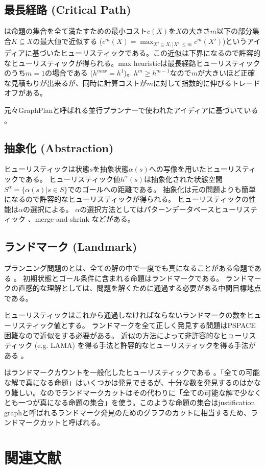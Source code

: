 \subsection{最長経路 (Critical Path)}

 \cite{haslum:00}は命題の集合を全て満たすための最小コスト$c(X)$を$X$の大きさ$m$以下の部分集合$K \subseteq X$の最大値で近似する ($c^m(X) = \max_{X' \subseteq X, |X'| \leq m} c^m(X')$)というアイディアに基づいたヒューリスティックである。この近似は下界になるので許容的なヒューリスティックが得られる。max heuristicは最長経路ヒューリスティックのうち$m=1$の場合である ($h^{max} = h^1$)。$h^m \geq h^{m-1}$なので$m$が大きいほど正確な見積もりが出来るが、同時に計算コストが$m$に対して指数的に伸びるトレードオフがある。

元々GraphPlanと呼ばれる並行プランナーで使われたアイディアに基づいている \cite{blum:97}。

\subsection{抽象化 (Abstraction)}

ヒューリスティックは状態$s$を抽象状態$\alpha(s)$への写像を用いたヒューリスティックである。
ヒューリスティック値$h^\alpha(s)$は抽象化された状態空間$S^\alpha = \{\alpha(s) | s \in S\}$でのゴールへの距離である。
抽象化は元の問題よりも簡単になるので許容的なヒューリスティックが得られる。
ヒューリスティックの性能は$\alpha$の選択による。
$\alpha$の選択方法としてはパターンデータベースヒューリスティック \cite{culberson1998pattern,edelkamp2001planning,holte:04,katz2008structural}、merge-and-shrink \cite{helmert2007flexible,helmert2014merge}などがある。


\subsection{ランドマーク (Landmark)}

プランニング問題のとは、全ての解の中で一度でも真になることがある命題である \cite{porteous2001extraction}。
初期状態とゴール条件に含まれる命題はランドマークである。
ランドマークの直感的な理解としては、問題を解くために通過する必要がある中間目標地点である。

ヒューリスティックはこれから通過しなければならないランドマークの数をヒューリスティック値とする。
ランドマークを全て正しく発見する問題はPSPACE困難なので近似をする必要がある。
近似の方法によって非許容的なヒューリスティック (e.g. LAMA) \cite{richter2008landmarks}を得る手法と許容的なヒューリスティックを得る手法がある \cite{karpas2009cost}。

はランドマークカウントを一般化したヒューリスティックである \cite{helmert:09}。「全ての可能な解で真になる命題」はいくつかは発見できるが、十分な数を発見するのはかなり難しい。なのでランドマークカットはその代わりに「全ての可能な解で少なくとも一つが真になる命題の集合」を使う。このような命題の集合はjustification graphと呼ばれるランドマーク発見のためのグラフのカットに相当するため、ランドマークカットと呼ばれる。


\section{関連文献}

\TODO{}
